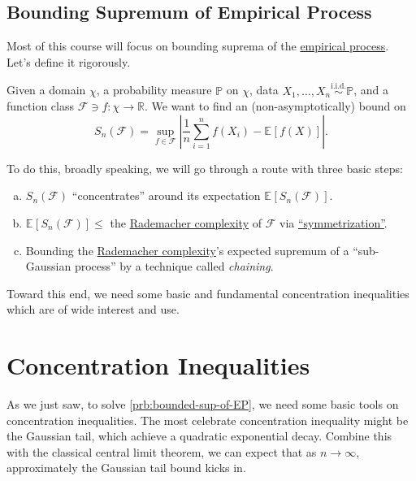 \section{Bounding Supremum of Empirical Process}
Most of this course will focus on bounding suprema of the \hyperref[def:EP]{empirical process}. Let's define it rigorously.

\begin{problem}\label{prb:bounded-sup-of-EP}
Given a domain \(\chi \), a probability measure \(\mathbb{P} \) on \(\chi \), data \(X_1, \dots , X_n \overset{\text{i.i.d.} }{\sim } \mathbb{P} \), and a function class \(\mathscr{F}\ni f \colon \chi \to \mathbb{R}  \). We want to find an (non-asymptotically) bound on
\[
	S_n(\mathscr{F} ) = \sup _{f\in \mathscr{F} } \left\vert \frac{1}{n} \sum_{i=1}^{n} f(X_i) - \mathbb{E}_{}\left[f(X) \right]  \right\vert.
\]
\end{problem}
\begin{answer}
	To do this, broadly speaking, we will go through a route with three basic steps:
	\begin{enumerate}[(a)]
		\item \(S_n(\mathscr{F} )\) ``concentrates'' around its expectation \(\mathbb{E}_{}\left[S_n(\mathscr{F} ) \right] \).
		\item \(\mathbb{E}_{}\left[S_n(\mathscr{F} ) \right] \leq \) the \hyperref[def:Rademacher-complexity]{Rademacher complexity} of \(\mathscr{F} \) via \hyperref[lma:symmetrization]{``symmetrization''}.
		\item Bounding the \hyperref[def:Rademacher-complexity]{Rademacher complexity}'s expected supremum of a ``sub-Gaussian process'' by a technique called \emph{chaining}.
	\end{enumerate}
\end{answer}

Toward this end, we need some basic and fundamental concentration inequalities which are of wide interest and use.

\chapter{Concentration Inequalities}
As we just saw, to solve \autoref{prb:bounded-sup-of-EP}, we need some basic tools on concentration inequalities. The most celebrate concentration inequality might be the Gaussian tail, which achieve a quadratic exponential decay. Combine this with the classical central limit theorem, we can expect that as \(n \to \infty \), approximately the Gaussian tail bound kicks in.

